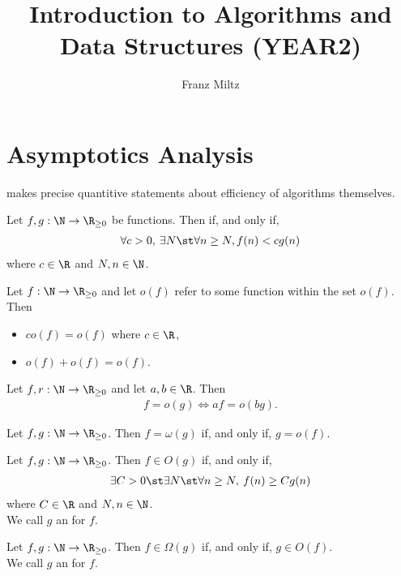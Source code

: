 \documentclass{article}
\begin{document}
\title{Introduction to Algorithms and Data Structures (YEAR2)}
\author{Franz Miltz}
\maketitle
\tableofcontents
\pagebreak


\section{Asymptotics Analysis}



 makes precise quantitive statements about efficiency of algorithms themselves.
\begin{definition}
	Let $f,g:\N\to\R_{\geq 0}$ be functions. Then
	 if, and only if, 
	\begin{align*}
		\forall c>0,\:\exists N\st \forall n \geq N, f(n)<cg(n)
	\end{align*}
	where $c\in\R$ and $N,n\in\N$.
\end{definition}
\begin{theorem}
	Let $f:\N\to\R_{\geq 0}$ and let $o(f)$ refer to some
	function within the set $o(f)$. Then
	\begin{itemize}
		\item $co(f)=o(f)$ where $c\in\R$,
		\item $o(f) + o(f) = o(f)$.
	\end{itemize}
\end{theorem}
\begin{theorem}
	Let $f,r:\N\to\R_{\geq 0}$ and let $a,b\in\R$. Then
	\begin{align*}
		f=o(g) \Leftrightarrow af=o(bg).	
	\end{align*}
\end{theorem}
\begin{definition}
	Let $f,g:\N\to\R_{\geq 0}$. Then $f=\omega(g)$ if, and only if, $g=o(f)$.
\end{definition}
\begin{definition}
	Let $f,g:\N\to\R_{\geq 0}$. Then $f\in O(g)$ if, and only if,
	\begin{align*}
		\exists C > 0\st \exists N \st \forall n \geq N,\: f(n) \geq Cg(n)
	\end{align*}
	where $C\in\R$ and $N,n\in\N$.\\
	We call $g$ an  for $f$.
\end{definition}
\begin{definition}
	Let $f,g:\N\to\R_{\geq 0}$. Then $f\in\Omega(g)$ if, and only if, $g\in O(f)$.\\
	We call $g$ an  for $f$.
\end{definition}
\end{document}
